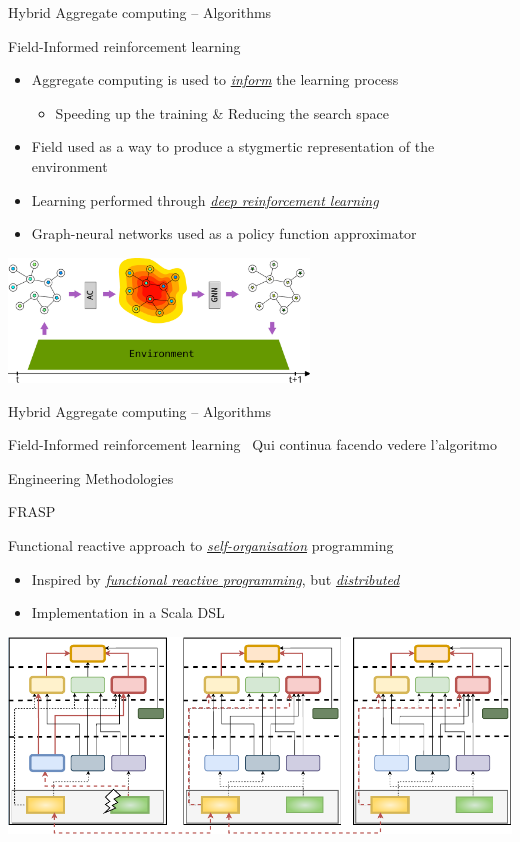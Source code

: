 \documentclass[presentation, 9pt,169]{beamer}\mode<presentation>{\usetheme{AMSBolognaFC}}
\begin{document}
\begin{frame}{Hybrid Aggregate computing -- Algorithms}
  
\begin{exampleblock}{Field-Informed reinforcement learning~\cite{acgnn}}
  \begin{itemize}
    \item Aggregate computing is used to \emph{\underline{inform}} the learning process
    \begin{itemize}
      \item Speeding up the training \& Reducing the search space
    \end{itemize} 
    \item Field used as a way to produce a stygmertic representation of the environment
    \item Learning performed through \emph{\underline{deep reinforcement learning}}
    \item Graph-neural networks used as a policy function approximator
  \end{itemize}
\centering
  \includegraphics[width=0.6\textwidth]{img/architecture.pdf}
\end{exampleblock}
\end{frame}
\begin{frame}{Hybrid Aggregate computing -- Algorithms}
  
  \begin{exampleblock}{Field-Informed reinforcement learning~\cite{acgnn}}
    Qui continua facendo vedere l'algoritmo
  \end{exampleblock}
  \end{frame}
\begin{frame}{Engineering Methodologies}
\begin{exampleblock}{FRASP~\cite{frasp}}
  
  Functional reactive approach to \emph{\underline{self-organisation}} programming
\begin{itemize}
  \item Inspired by \emph{\underline{functional reactive programming}}, but \emph{\underline{distributed}}
  \item Implementation in a Scala DSL
\end{itemize}
\includegraphics[width=\textwidth]{img/interactions.pdf}
\end{exampleblock}
\end{frame}
\end{document}
